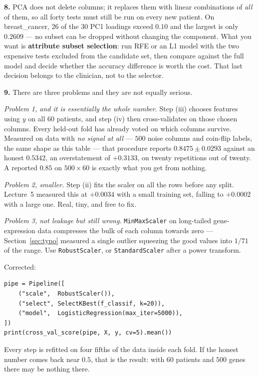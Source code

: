 \documentclass[11pt]{article}
\begin{document}
\medskip
\textbf{8.} PCA does not delete columns; it replaces them with linear
combinations of \emph{all} of them, so all forty tests must still be run on
every new patient. On breast\_cancer, $26$ of the $30$ PC1 loadings exceed
$0.10$ and the largest is only $0.2609$ --- no subset can be dropped without
changing the component. What you want is \textbf{attribute subset selection}:
run RFE or an L1 model with the two expensive tests excluded from the candidate
set, then compare against the full model and decide whether the accuracy
difference is worth the cost. That last decision belongs to the clinician, not
to the selector.

\medskip
\textbf{9.} There are three problems and they are not equally serious.

\emph{Problem 1, and it is essentially the whole number.} Step (iii) chooses
features using $y$ on all $60$ patients, and step (iv) then cross-validates on
those chosen columns. Every held-out fold has already voted on which columns
survive. Measured on data with \emph{no signal at all} --- $500$ noise columns
and coin-flip labels, the same shape as this table --- that procedure reports
$0.8475 \pm 0.0293$ against an honest $0.5342$, an overstatement of $+0.3133$,
on twenty repetitions out of twenty. A reported $0.85$ on $500 \times 60$ is
exactly what you get from nothing.

\emph{Problem 2, smaller.} Step (ii) fits the scaler on all the rows before
any split. Lecture~5 measured this at $+0.0034$ with a small training set,
falling to $+0.0002$ with a large one. Real, tiny, and free to fix.

\emph{Problem 3, not leakage but still wrong.} \texttt{MinMaxScaler} on
long-tailed gene-expression data compresses the bulk of each column towards
zero --- Section~\ref{sec:typo} measured a single outlier squeezing the good
values into $1/71$ of the range. Use \texttt{RobustScaler}, or
\texttt{StandardScaler} after a power transform.

Corrected:

\begin{lstlisting}
pipe = Pipeline([
    ("scale",  RobustScaler()),
    ("select", SelectKBest(f_classif, k=20)),
    ("model",  LogisticRegression(max_iter=5000)),
])
print(cross_val_score(pipe, X, y, cv=5).mean())
\end{lstlisting}

Every step is refitted on four fifths of the data inside each fold. If the
honest number comes back near $0.5$, that is the result: with $60$ patients and
$500$ genes there may be nothing there.
\end{document}
